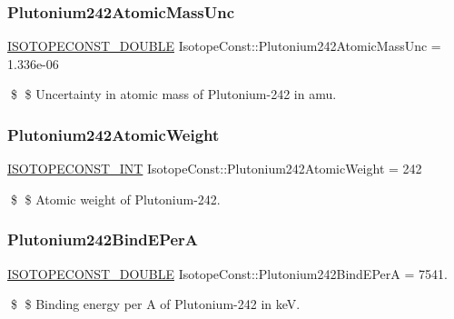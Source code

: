 \subsubsection{\texorpdfstring{Plutonium242\+Atomic\+Mass\+Unc}{Plutonium242AtomicMassUnc}}
{\footnotesize\ttfamily \mbox{\hyperlink{group___isotope_const-_macros_ga8f45a7272ce02c0b4c65c44636ed719a}{I\+S\+O\+T\+O\+P\+E\+C\+O\+N\+S\+T\+\_\+\+D\+O\+U\+B\+LE}} Isotope\+Const\+::\+Plutonium242\+Atomic\+Mass\+Unc = 1.\+336e-\/06}

\$ \$ Uncertainty in atomic mass of Plutonium-\/242 in amu. \mbox{\label{group___isotope_const-_plutonium-_pu242_gacffcd8f766d79fae9f60aedb0a076489}} 
\subsubsection{\texorpdfstring{Plutonium242\+Atomic\+Weight}{Plutonium242AtomicWeight}}
{\footnotesize\ttfamily \mbox{\hyperlink{group___isotope_const-_macros_ga5f18360b3e99483a35c32d789e62621c}{I\+S\+O\+T\+O\+P\+E\+C\+O\+N\+S\+T\+\_\+\+I\+NT}} Isotope\+Const\+::\+Plutonium242\+Atomic\+Weight = 242}

\$ \$ Atomic weight of Plutonium-\/242. \mbox{\label{group___isotope_const-_plutonium-_pu242_gaec04d47751c1f59c7e2289a125499cee}} 
\subsubsection{\texorpdfstring{Plutonium242\+Bind\+E\+PerA}{Plutonium242BindEPerA}}
{\footnotesize\ttfamily \mbox{\hyperlink{group___isotope_const-_macros_ga8f45a7272ce02c0b4c65c44636ed719a}{I\+S\+O\+T\+O\+P\+E\+C\+O\+N\+S\+T\+\_\+\+D\+O\+U\+B\+LE}} Isotope\+Const\+::\+Plutonium242\+Bind\+E\+PerA = 7541.}

\$ \$ Binding energy per A of Plutonium-\/242 in keV. \mbox{\label{group___isotope_const-_plutonium-_pu242_ga4e05e4a6b464da046cab267c121c73f5}} 
